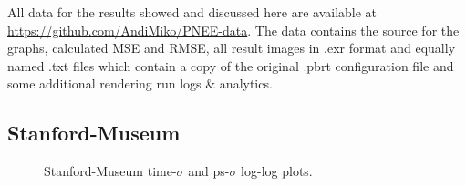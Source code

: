 All data for the results showed and discussed here are available at \url{https://github.com/AndiMiko/PNEE-data}. The data contains the source for the graphs, calculated MSE and RMSE, all result images in .exr format and equally named .txt files which contain a copy of the original .pbrt configuration file and some additional rendering run logs \& analytics.

\subsection{Stanford-Museum}
\label{sec:sm_eval}

\label{ch:ev:photontree}
\label{ch:ev:cdftree}

\begin{figure}
    \centering
    \begin{subfigure}{.5\textwidth}
      \centering
        \caption{}
        \label{fig:smmain_t}
    \end{subfigure}%
    \begin{subfigure}{.5\textwidth}
        \caption{}
        \label{fig:smmain_ps}
    \end{subfigure}
    \caption{Stanford-Museum time-$\sigma$ and ps-$\sigma$ log-log plots.}
    \label{fig:smmain}
\end{figure}


